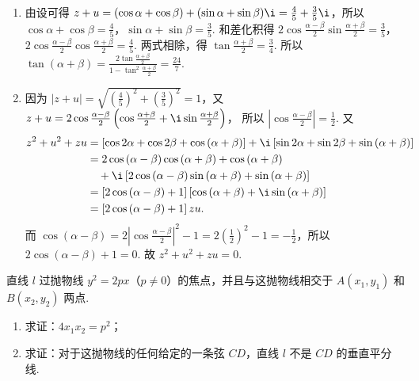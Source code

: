 \begin{solution}
\begin{enumerate}
\item 由设可得 \(z + u = (\cos \alpha + \cos \beta) + (\sin \alpha + \sin \beta)\i = \frac{4}{5}+\frac{3}{5}\i\)，所以 \(\cos\alpha+\cos\beta=\frac{4}{5}\)，\(\sin\alpha+\sin\beta=\frac{3}{5}\). 和差化积得
\(2\cos\frac{\alpha-\beta}{2}\sin\frac{\alpha+\beta}{2}=\frac{3}{5}\)，\(2\cos\frac{\alpha-\beta}{2}\cos\frac{\alpha+\beta}{2}=\frac{4}{5}\).
两式相除，得 \(\tan\frac{\alpha+\beta}{2}=\frac{3}{4}\). 所以
\(\tan(\alpha+\beta)=\frac{2\tan\frac{\alpha+\beta}{2}}{1-\tan^{2}\frac{\alpha+\beta}{2}}=\frac{24}{7}\).

\item 因为 \(\left|z + u\right| = \sqrt{\left(\frac{4}{5}\right)^2 + \left(\frac{3}{5}\right)^2} = 1\)，又
\(z + u = 2 \cos \frac{\alpha - \beta}{2} \left( \cos \frac{\alpha + \beta}{2} + \i \sin \frac{\alpha + \beta}{2} \right)\)，
所以 \(\left|\cos \frac{\alpha - \beta}{2}\right| = \frac{1}{2}\). 又
\[
\begin{aligned}
z^{2}+u^{2}+zu
&=\left[\cos2\alpha+\cos2\beta+\cos\left(\alpha+\beta\right)\right]+\i\left[\sin2\alpha+\sin2\beta+\sin\left(\alpha+\beta\right)\right]\\
&=2\cos\left(\alpha-\beta\right)\cos\left(\alpha+\beta\right)+\cos\left(\alpha+\beta\right)\\
&\quad +\i\left[2\cos\left(\alpha-\beta\right)\sin\left(\alpha+\beta\right)+\sin\left(\alpha+\beta\right)\right]\\
&=\left[2\cos\left(\alpha-\beta\right)+1\right]\left[\cos\left(\alpha+\beta\right)+\i\sin\left(\alpha+\beta\right)\right]\\
&=\left[2\cos\left(\alpha-\beta\right)+1\right]zu.
\end{aligned}
\]
而 \(\cos(\alpha-\beta)=2\left|\cos\frac{\alpha-\beta}{2}\right|^{2}-1=2\left(\frac{1}{2}\right)^{2}-1=-\frac{1}{2}\)，所以 \(2\cos(\alpha-\beta)+1=0\). 故 \(z^{2}+u^{2}+zu=0\).
\end{enumerate}
\end{solution}

\begin{problem}

直线 \(l\) 过抛物线 \(y^{2}=2px\)（\(p\neq0\)）的焦点，并且与这抛物线相交于 \(A\left(x_{1},y_{1}\right)\) 和 \(B\left(x_{2},y_{2}\right)\) 两点.

\begin{enumerate}
\item 求证：\(4x_{1}x_{2}=p^{2}\)；
\item 求证：对于这抛物线的任何给定的一条弦 \(CD\)，直线 \(l\) 不是 \(CD\) 的垂直平分线.
\end{enumerate}
\end{problem}

